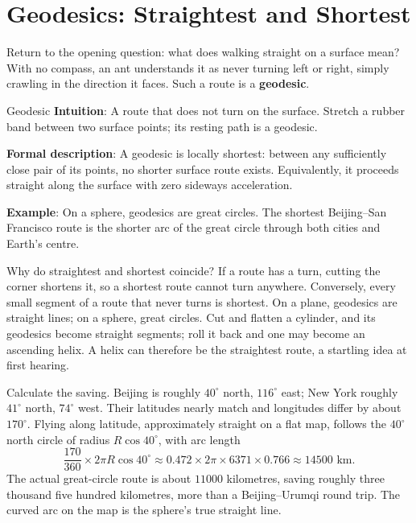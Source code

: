 \section{Geodesics: Straightest and Shortest}

Return to the opening question: what does walking straight on a surface mean? With no compass, an ant understands it as never turning left or right, simply crawling in the direction it faces. Such a route is a \textbf{geodesic}.

\begin{shuyu}{Geodesic}
\textbf{Intuition}: A route that does not turn on the surface. Stretch a rubber band between two surface points; its resting path is a geodesic.

\textbf{Formal description}: A geodesic is locally shortest: between any sufficiently close pair of its points, no shorter surface route exists. Equivalently, it proceeds straight along the surface with zero sideways acceleration.

\textbf{Example}: On a sphere, geodesics are great circles. The shortest Beijing--San Francisco route is the shorter arc of the great circle through both cities and Earth's centre.
\end{shuyu}

Why do straightest and shortest coincide? If a route has a turn, cutting the corner shortens it, so a shortest route cannot turn anywhere. Conversely, every small segment of a route that never turns is shortest. On a plane, geodesics are straight lines; on a sphere, great circles. Cut and flatten a cylinder, and its geodesics become straight segments; roll it back and one may become an ascending helix. A helix can therefore be the straightest route, a startling idea at first hearing.

Calculate the saving. Beijing is roughly $40^\circ$ north, $116^\circ$ east; New York roughly $41^\circ$ north, $74^\circ$ west. Their latitudes nearly match and longitudes differ by about $170^\circ$. Flying along latitude, approximately straight on a flat map, follows the $40^\circ$ north circle of radius $R\cos 40^\circ$, with arc length
\[ \frac{170}{360}\times 2\pi R \cos 40^\circ \approx 0.472 \times 2\pi \times 6371 \times 0.766 \approx 14500 \text{ km}. \]
The actual great-circle route is about $11000$ kilometres, saving roughly three thousand five hundred kilometres, more than a Beijing--Urumqi round trip. The curved arc on the map is the sphere's true straight line.

